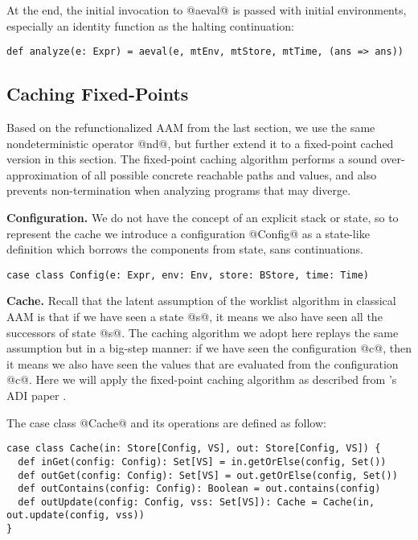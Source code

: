 \documentclass[acmsmall]{acmart}\settopmatter{}
\begin{document}
At the end, the initial invocation to @aeval@ is passed with initial environments,
especially an identity function as the halting continuation:
\begin{lstlisting}
def analyze(e: Expr) = aeval(e, mtEnv, mtStore, mtTime, (ans => ans))
\end{lstlisting}

\subsection{Caching Fixed-Points}

Based on the refunctionalized AAM from the last section, we use the same nondeterministic
operator @nd@, but further extend it to a fixed-point cached version in this section.
The fixed-point caching algorithm performs a sound over-approximation of all possible
concrete reachable paths and values, and also prevents non-termination when analyzing 
programs that may diverge.

\textbf{Configuration.}
We do not have the concept of an explicit stack or state, so to represent the cache 
we introduce a configuration @Config@ as a state-like definition which borrows the 
components from state, sans continuations.

\begin{lstlisting}
case class Config(e: Expr, env: Env, store: BStore, time: Time)
\end{lstlisting}

\textbf{Cache.}
Recall that the latent assumption of the worklist algorithm in classical AAM is that 
if we have seen a state @s@, it means we also have seen all the successors of state @s@.
The caching algorithm we adopt here replays the same assumption but in a big-step 
manner: if we have seen the configuration @c@, then it means we also have seen the 
values that are evaluated from the configuration @c@.
Here we will apply the fixed-point caching algorithm as described from
\citeauthor{darais2017abstracting}'s ADI paper \cite{darais2017abstracting}.

The case class @Cache@ and its operations are defined as follow:

\begin{lstlisting}
case class Cache(in: Store[Config, VS], out: Store[Config, VS]) {
  def inGet(config: Config): Set[VS] = in.getOrElse(config, Set())
  def outGet(config: Config): Set[VS] = out.getOrElse(config, Set())
  def outContains(config: Config): Boolean = out.contains(config)
  def outUpdate(config: Config, vss: Set[VS]): Cache = Cache(in, out.update(config, vss))
}
\end{lstlisting}
\end{document}
